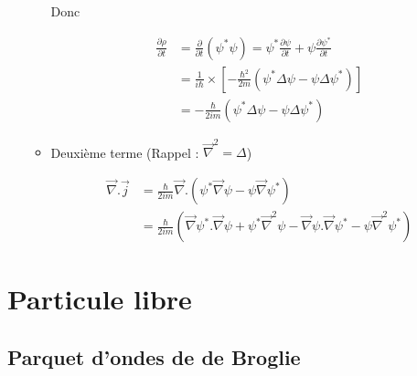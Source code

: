 \begin{itemize}
\begin{myproof}{}{}
\begin{itemize}
           Donc
           
           \begin{align}
             \frac{\partial \rho}{\partial t} &= \frac{\partial }{\partial t}  ( \psi ^{*} \psi) = \psi ^{*} \frac{\partial \psi}{\partial t} + \psi \frac{\partial \psi ^{*}}{\partial t}  \\
                                              &= \frac{1}{i \hbar}  \times \left[ - \frac{\hbar ^{2}}{2m} (\psi ^{
                 *
             } \Delta \psi - \psi \Delta \psi ^{*}) \right] \\ 
             &= - \frac{\hbar}{2im} (\psi ^{*} \Delta \psi - \psi \Delta \psi ^{*})
           \end{align}

          \item Deuxième terme (Rappel : $\overrightarrow{\nabla} ^{2} = \Delta$)

            \begin{align}
              \overrightarrow{\nabla}. \overrightarrow{j} &= \frac{\hbar}{2im} \overrightarrow{\nabla}.( \psi ^{*} \overrightarrow{\nabla} \psi - \psi \overrightarrow{\nabla} \psi ^{*}) \\
                                                          &= \frac{\hbar}{2im}  ( \overrightarrow{\nabla}\psi ^{*}. \overrightarrow{\nabla} \psi + \psi ^{*} \overrightarrow{\nabla} ^{2} \psi - \overrightarrow{\nabla} \psi. \overrightarrow{\nabla} \psi ^{*} - \psi \overrightarrow{\nabla} ^{2} \psi ^{*})
            \end{align}

     \end{itemize}
    \end{myproof}

    

      

\end{itemize}

\newpage
\section{Particule libre} %
\label{sec:Particule libre}

\subsection{Parquet d'ondes de de Broglie} %
\label{sub:Parquet d'ondes de de Broglie}

